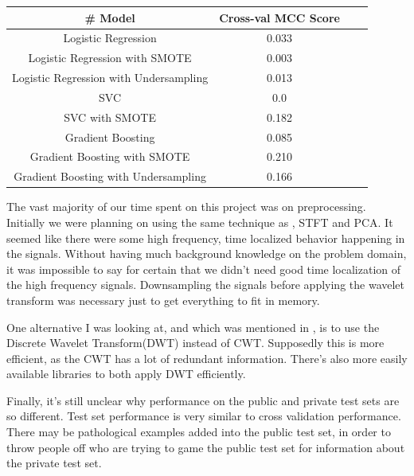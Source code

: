 \documentclass{article}
\begin{document}
\begin{center}
\begin{tabular}{ |c|c|c|c| } 
\hline
\# Model & Cross-val MCC Score \\
\hline
Logistic Regression & 0.033 \\ 
Logistic Regression with SMOTE & 0.003 \\
Logistic Regression with Undersampling & 0.013 \\
SVC & 0.0 \\
SVC with SMOTE & 0.182 \\
Gradient Boosting & 0.085 \\
Gradient Boosting with SMOTE & 0.210 \\
Gradient Boosting with Undersampling & 0.166 \\
\hline
\end{tabular}
\end{center}


The vast majority of our time spent on this project was on preprocessing.
Initially we were planning on using the same technique as \cite{hw4b}, STFT and
PCA. It seemed like there were some high frequency, time localized behavior
happening in the signals. Without having much background knowledge on the
problem domain, it was impossible to say for certain that we didn't need good
time localization of the high frequency signals. Downsampling the signals before
applying the wavelet transform was necessary just to get everything to fit in
memory.

One alternative I was looking at, and which was mentioned in \cite{article}, is
to use the Discrete Wavelet Transform(DWT) instead of CWT. Supposedly this is
more efficient, as the CWT has a lot of redundant information. There's also more
easily available libraries to both apply DWT efficiently.

Finally, it's still unclear why performance on the public and private test sets
are so different. Test set performance is very similar to cross validation
performance. There may be pathological examples added into the public test set,
in order to throw people off who are trying to game the public test set for
information about the private test set.


\FloatBarrier
\printbibliography
\end{document}
